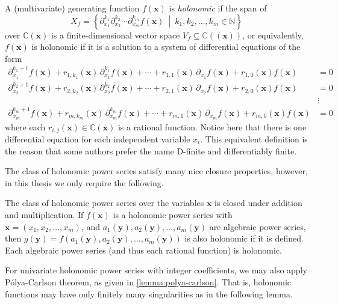 A (multivariate) generating function $f(\mathbf{x})$ is \emph{holonomic} if the span of
\[
	X_f=
	\left\{
		\partial_{x_1}^{k_1} \partial_{x_2}^{k_2} \cdots \partial_{x_m}^{k_m}
		f(\mathbf{x})
	\ \middle\vert\ 
		k_1,k_2,\ldots,k_m \in \mathbb{N}
	\right\}
\]
over $\mathbb{C}(\mathbf{x})$ is a finite-dimensional vector space $V_f \subseteq \mathbb{C}((\mathbf{x}))$, or equivalently, $f(\mathbf{x})$ is holonomic if it is a solution to a system of differential equations of the form
\begin{align*}
	\partial_{x_1}^{k_1 + 1} f(\mathbf{x})
	+ r_{1,k_1}(\mathbf{x}) \, \partial_{x_1}^{k_1}  f(\mathbf{x})
	+ \cdots
	+ r_{1,1}(\mathbf{x}) \, \partial_{x_1} f(\mathbf{x})
	+ r_{1,0}(\mathbf{x}) f(\mathbf{x})
	&=
	0
	\\
	\partial_{x_2}^{k_2 + 1} f(\mathbf{x})
	+ r_{2,k_2}(\mathbf{x}) \, \partial_{x_2}^{k_2}  f(\mathbf{x})
	+ \cdots
	+ r_{2,1}(\mathbf{x}) \, \partial_{x_2} f(\mathbf{x})
	+ r_{2,0}(\mathbf{x}) f(\mathbf{x})
	&=
	0
	\\
	&\vdots
	\\
	\partial_{x_m}^{k_m + 1} f(\mathbf{x})
	+ r_{m,k_m}(\mathbf{x}) \,\partial_{x_m}^{k_m}  f(\mathbf{x})
	+ \cdots
	+ r_{m,1}(\mathbf{x}) \,\partial_{x_m} f(\mathbf{x})
	+ r_{m,0}(\mathbf{x}) f(\mathbf{x})
	&=
	0
\end{align*}
where each $r_{i,j}(\mathbf{x}) \in \mathbb{C}(\mathbf{x})$ is a rational function.
Notice here that there is one differential equation for each independent variable $x_i$.
This equivalent definition is the reason that some authors prefer the name D-finite and 
differentiably finite.

The class of holonomic power series satisfy many nice closure properties, however, in this thesis we only require the following.

\begin{lemma}\label{lemma:holonomic-closure-properties}
	The class of holonomic power series over the variables $\mathbf{x}$ is closed under addition and multiplication.
	If $f(\mathbf{x})$ is a holonomic power series with $\mathbf{x} = (x_1,x_2,\ldots,x_m)$, and $a_1(\mathbf{y}), a_2(\mathbf{y}), \ldots, a_m(\mathbf{y})$ are algebraic power series, then $g(\mathbf{y}) = f(a_1(\mathbf{y}),a_2(\mathbf{y}),\ldots,a_m(\mathbf{y}))$ is also holonomic if it is defined.
	Each algebraic power series (and thus each rational function) is holonomic.
\end{lemma}

For univariate holonomic power series with integer coefficients, we may also apply P\'olya-Carlson theorem, as given in \cref{lemma:polya-carlson}.
That is, holonomic functions may have only finitely many singularities as in the following lemma.

